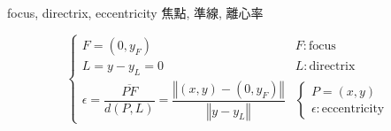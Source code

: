 \documentclass[
]{book}
\theoremstyle{definition}
\theoremstyle{definition}
\theoremstyle{definition}
\theoremstyle{definition}
\theoremstyle{remark}
\begin{document}
\begin{CJK}{UTF8}{bsmi}
focus, directrix, eccentricity 焦點, 準線, 離心率
\end{CJK}

\[
\begin{cases}
F=\left(0,y_{{\scriptscriptstyle F}}\right) & F:\text{focus}\\
L=y-y_{{\scriptscriptstyle L}}=0 & L:\text{directrix}\\
\epsilon=\dfrac{\overline{PF}}{d\left(P,L\right)}=\dfrac{\left\Vert \left(x,y\right)-\left(0,y_{{\scriptscriptstyle F}}\right)\right\Vert }{\left\Vert y-y_{{\scriptscriptstyle L}}\right\Vert } & \begin{cases}
P=\left(x,y\right)\\
\epsilon:\text{eccentricity}
\end{cases}
\end{cases}
\]
\end{document}
